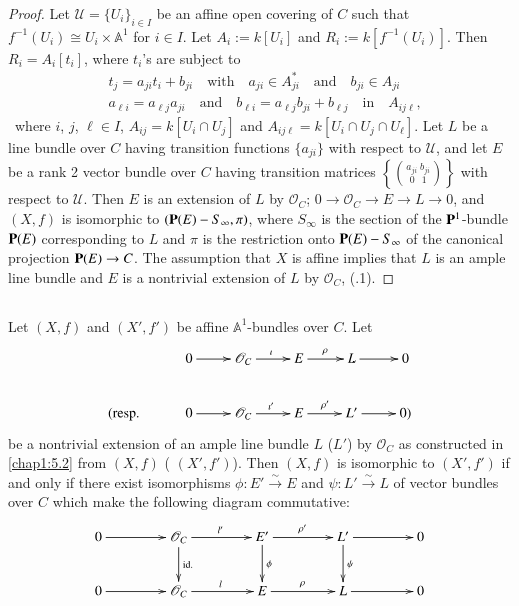 \begin{proof}
Let $\mathscr{U}=\{U_{i}\}_{i\in I}$ be an affine open covering of $C$
such that $f^{-1}(U_{i})\cong U_{i}\times \mathbb{A}^{1}$ for $i\in
I$. Let $A_{i}:=k[U_{i}]$ and $R_{i}:=k[f^{-1}(U_{i})]$. Then
$R_{i}=A_{i}[t_{i}]$, where $t_{i}$'s are subject to 
\begin{align*}
& t_{j}=a_{ji}t_{i}+b_{ji}\quad\text{with}\quad a_{ji}\in
A^{\ast}_{ji}\quad\text{and}\quad b_{ji}\in A_{ji}\\
& a_{\ell i}=a_{\ell j}a_{ji}\quad\text{and}\quad b_{\ell i}=a_{\ell
  j}b_{ji}+b_{\ell j}\quad\text{in}\quad A_{ij\ell},
\end{align*}\pageoriginale\
where $i$, $j$, $\ell\in I$, $A_{ij}=k[U_{i}\cap U_{j}]$ and
$A_{ij\ell}=k[U_{i}\cap U_{j}\cap U_{\ell}]$. Let $L$ be a line bundle
over $C$ having transition functions $\{a_{ji}\}$ with respect to
$\mathscr{U}$, and let $E$ be a rank 2 vector bundle over $C$ having
transition matrices $\left\{\binom{a_{ji}\; b_{ji}}{0\;\;\,1}\right\}$
with respect to $\mathscr{U}$. Then $E$ is an extension of $L$ by
$\mathscr{O}_{C}$; $0\to \mathscr{O}_{C}\to E\to L\to 0$, and $(X,f)$
is isomorphic to $(\mathbf{P}(E)-S_{\infty},\pi)$, where $S_{\infty}$ is the
section of the $\mathbf{P}^{1}$-bundle $\mathbf{P}(E)$ corresponding to $L$ and
$\pi$ is the restriction onto $\mathbf{P}(E)-S_{\infty}$ of the canonical
projection $\mathbf{P}(E)\to C$. The assumption that $X$ is affine implies
that $L$ is an ample line bundle and $E$ is a nontrivial extension of
$L$ by $\mathscr{O}_{C}$, (\cf 2.4.1).
\end{proof}

\subsection{}\label{chap1:5.3}
\begin{lemma*}
  Let $(X,f)$ and $(X',f')$ be affine $\mathbb{A}^{1}$-bundles over
  $C$. Let
  \[
  \xymatrix{ & 0 \ar[r]& \mathscr{O}_C \ar[r]^\imath & E \ar[r]^\rho &
  L\ar[r]& 0\\ 
    (\text{\resp} &0 \ar[r]& \mathscr{O}_C \ar[r]^{\imath'} & E
    \ar[r]^{\rho'} & L'\ar[r]& 0) 
  }
  \]
  be a nontrivial extension of an ample line bundle $L$ (\resp $L'$) by
  $\mathscr{O}_{C}$ as constructed in \ref{chap1:5.2} from $(X,f)$ (\resp
  $(X',f')$). Then $(X,f)$ is isomorphic to $(X',f')$ if and only if
  there exist isomorphisms $\phi:E'\xrightarrow{\sim}E$ and
  $\psi:L'\xrightarrow{\sim}L$ of vector bundles over $C$ which make the
  following diagram commutative:
  \[
  \xymatrix@C=1.5cm{
    0\ar[r] & \mathscr{O}_{C}\ar[d]^{\text{\rm id.}}\ar[r]^{l'} &
    E'\ar[d]^{\phi}\ar[r]^{\rho'} & L'\ar[d]^{\psi}\ar[r] & 0\\
    0\ar[r] & \mathscr{O}_{C}\ar[r]^{l} & E\ar[r]^{\rho} & L\ar[r] & 0
  }
  \]
\end{lemma*}

